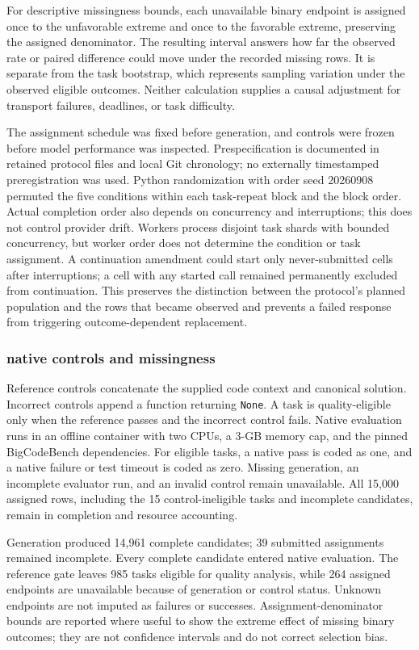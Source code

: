\documentclass[10pt,letterpaper]{article}
\begin{document}
For descriptive missingness bounds, each unavailable binary endpoint is assigned once to the unfavorable extreme and once to the favorable extreme, preserving the assigned denominator. The resulting interval answers how far the observed rate or paired difference could move under the recorded missing rows. It is separate from the task bootstrap, which represents sampling variation under the observed eligible outcomes. Neither calculation supplies a causal adjustment for transport failures, deadlines, or task difficulty.

The assignment schedule was fixed before generation, and controls were frozen before model performance was inspected. Prespecification is documented in retained protocol files and local Git chronology; no externally timestamped preregistration was used. Python randomization with order seed 20260908 permuted the five conditions within each task-repeat block and the block order. Actual completion order also depends on concurrency and interruptions; this does not control provider drift. Workers process disjoint task shards with bounded concurrency, but worker order does not determine the condition or task assignment. A continuation amendment could start only never-submitted cells after interruptions; a cell with any started call remained permanently excluded from continuation. This preserves the distinction between the protocol's planned population and the rows that became observed and prevents a failed response from triggering outcome-dependent replacement.

\subsubsection*{native controls and missingness}
Reference controls concatenate the supplied code context and canonical solution. Incorrect controls append a function returning \texttt{None}. A task is quality-eligible only when the reference passes and the incorrect control fails. Native evaluation runs in an offline container with two CPUs, a 3-GB memory cap, and the pinned BigCodeBench dependencies. For eligible tasks, a native pass is coded as one, and a native failure or test timeout is coded as zero. Missing generation, an incomplete evaluator run, and an invalid control remain unavailable. All 15,000 assigned rows, including the 15 control-ineligible tasks and incomplete candidates, remain in completion and resource accounting.

Generation produced 14,961 complete candidates; 39 submitted assignments remained incomplete. Every complete candidate entered native evaluation. The reference gate leaves 985 tasks eligible for quality analysis, while 264 assigned endpoints are unavailable because of generation or control status. Unknown endpoints are not imputed as failures or successes. Assignment-denominator bounds are reported where useful to show the extreme effect of missing binary outcomes; they are not confidence intervals and do not correct selection bias.
\end{document}

